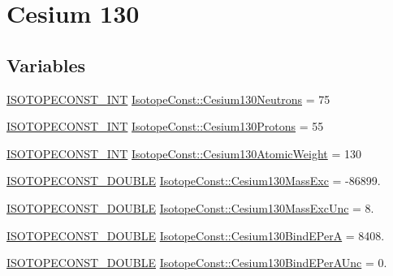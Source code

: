 \hypertarget{group___isotope_const-_cesium-_cs130}{}\section{Cesium 130}
\label{group___isotope_const-_cesium-_cs130}
\subsection*{Variables}
\begin{DoxyCompactItemize}
\item 
\mbox{\hyperlink{group___isotope_const-_macros_ga5f18360b3e99483a35c32d789e62621c}{I\+S\+O\+T\+O\+P\+E\+C\+O\+N\+S\+T\+\_\+\+I\+NT}} \mbox{\hyperlink{group___isotope_const-_cesium-_cs130_gadb01c14856a13934399449c21c83959d}{Isotope\+Const\+::\+Cesium130\+Neutrons}} = 75
\item 
\mbox{\hyperlink{group___isotope_const-_macros_ga5f18360b3e99483a35c32d789e62621c}{I\+S\+O\+T\+O\+P\+E\+C\+O\+N\+S\+T\+\_\+\+I\+NT}} \mbox{\hyperlink{group___isotope_const-_cesium-_cs130_gab1f3e0e5cc0f7aa013fdeda35b40ce39}{Isotope\+Const\+::\+Cesium130\+Protons}} = 55
\item 
\mbox{\hyperlink{group___isotope_const-_macros_ga5f18360b3e99483a35c32d789e62621c}{I\+S\+O\+T\+O\+P\+E\+C\+O\+N\+S\+T\+\_\+\+I\+NT}} \mbox{\hyperlink{group___isotope_const-_cesium-_cs130_gac157d03c8bdd47b87226bff367a75462}{Isotope\+Const\+::\+Cesium130\+Atomic\+Weight}} = 130
\item 
\mbox{\hyperlink{group___isotope_const-_macros_ga8f45a7272ce02c0b4c65c44636ed719a}{I\+S\+O\+T\+O\+P\+E\+C\+O\+N\+S\+T\+\_\+\+D\+O\+U\+B\+LE}} \mbox{\hyperlink{group___isotope_const-_cesium-_cs130_ga0f692e5d7ec70a3fac0d650776e3a410}{Isotope\+Const\+::\+Cesium130\+Mass\+Exc}} = -\/86899.
\item 
\mbox{\hyperlink{group___isotope_const-_macros_ga8f45a7272ce02c0b4c65c44636ed719a}{I\+S\+O\+T\+O\+P\+E\+C\+O\+N\+S\+T\+\_\+\+D\+O\+U\+B\+LE}} \mbox{\hyperlink{group___isotope_const-_cesium-_cs130_gae67efb01b703c3820a2d9394ea482eca}{Isotope\+Const\+::\+Cesium130\+Mass\+Exc\+Unc}} = 8.
\item 
\mbox{\hyperlink{group___isotope_const-_macros_ga8f45a7272ce02c0b4c65c44636ed719a}{I\+S\+O\+T\+O\+P\+E\+C\+O\+N\+S\+T\+\_\+\+D\+O\+U\+B\+LE}} \mbox{\hyperlink{group___isotope_const-_cesium-_cs130_gacbed70180f4dd7dd21e6c40e4ec80012}{Isotope\+Const\+::\+Cesium130\+Bind\+E\+PerA}} = 8408.
\item 
\mbox{\hyperlink{group___isotope_const-_macros_ga8f45a7272ce02c0b4c65c44636ed719a}{I\+S\+O\+T\+O\+P\+E\+C\+O\+N\+S\+T\+\_\+\+D\+O\+U\+B\+LE}} \mbox{\hyperlink{group___isotope_const-_cesium-_cs130_ga0ef32db3d1d01541d8bf523e203fd5d0}{Isotope\+Const\+::\+Cesium130\+Bind\+E\+Per\+A\+Unc}} = 0.

\end{DoxyCompactItemize}

